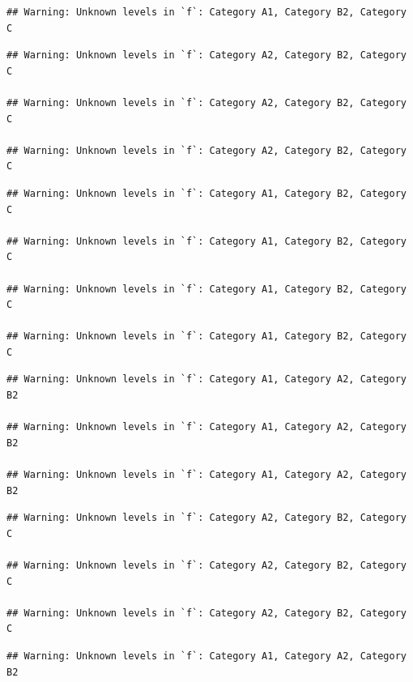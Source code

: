 \documentclass[preprint, 3p,
authoryear]{elsarticle} %
\begin{document}
\begin{verbatim}
## Warning: Unknown levels in `f`: Category A1, Category B2, Category C
\end{verbatim}

\begin{verbatim}
## Warning: Unknown levels in `f`: Category A2, Category B2, Category C

## Warning: Unknown levels in `f`: Category A2, Category B2, Category C

## Warning: Unknown levels in `f`: Category A2, Category B2, Category C
\end{verbatim}

\begin{verbatim}
## Warning: Unknown levels in `f`: Category A1, Category B2, Category C

## Warning: Unknown levels in `f`: Category A1, Category B2, Category C

## Warning: Unknown levels in `f`: Category A1, Category B2, Category C

## Warning: Unknown levels in `f`: Category A1, Category B2, Category C
\end{verbatim}

\begin{verbatim}
## Warning: Unknown levels in `f`: Category A1, Category A2, Category B2

## Warning: Unknown levels in `f`: Category A1, Category A2, Category B2

## Warning: Unknown levels in `f`: Category A1, Category A2, Category B2
\end{verbatim}

\begin{verbatim}
## Warning: Unknown levels in `f`: Category A2, Category B2, Category C

## Warning: Unknown levels in `f`: Category A2, Category B2, Category C

## Warning: Unknown levels in `f`: Category A2, Category B2, Category C
\end{verbatim}

\begin{verbatim}
## Warning: Unknown levels in `f`: Category A1, Category A2, Category B2
\end{verbatim}
\end{document}
